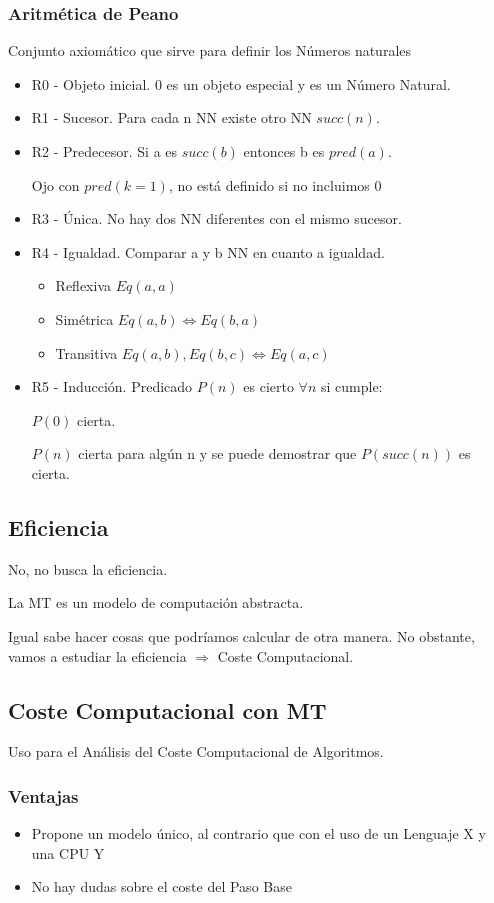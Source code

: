 \subsubsection{Aritmética de Peano} 
Conjunto axiomático que sirve para definir los Números naturales
\begin{itemize}
    \item R0 - Objeto inicial. 0 es un objeto especial y es un Número Natural.
    \item R1 - Sucesor. Para cada n NN existe otro NN $succ(n)$.
    \item R2 - Predecesor. Si a es $succ(b)$ entonces b es $pred(a)$.
    
    Ojo con $pred(k=1)$, no está definido si no incluimos 0
    \item R3 - Única. No hay dos NN diferentes con el mismo sucesor.
    \item R4 - Igualdad. Comparar a y b NN en cuanto a igualdad.
    \begin{itemize}
        \item Reflexiva $Eq(a,a)$
        \item Simétrica $Eq(a,b) \Leftrightarrow Eq(b,a)$
        \item Transitiva $Eq(a,b), Eq(b,c) \Leftrightarrow Eq(a,c)$
    \end{itemize}
    \item R5 - Inducción. Predicado $P(n)$ es cierto $\forall n$ si cumple: 
    
    $P(0)$ cierta.
    
    $P(n)$ cierta para algún n y se puede demostrar que $P(succ(n))$ es cierta.
\end{itemize}

\subsection{Eficiencia}
No, no busca la eficiencia.

La MT es un modelo de computación abstracta.

Igual sabe hacer cosas que podríamos calcular de otra manera. No obstante, vamos a estudiar la eficiencia $\Rightarrow$ Coste Computacional.

\subsection{Coste Computacional con MT}
Uso para el Análisis del Coste Computacional de Algoritmos.

\subsubsection{Ventajas}
\begin{itemize}
    \item Propone un modelo único, al contrario que con el uso de un Lenguaje X y una CPU Y
    \item No hay dudas sobre el coste del Paso Base
\end{itemize}

